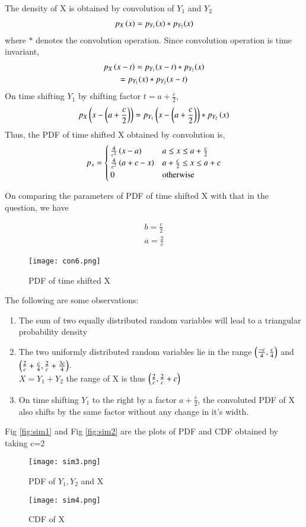 \documentclass[journal,12pt,twocolumn]{IEEEtran}
\begin{document}
The density of X is obtained by convolution of $Y_1$ and $Y_2$
\begin{align}
p_X\left(x\right) = p_{Y_1}(x)*p_{Y_2}(x)
\end{align}
where $*$ denotes the convolution operation. Since convolution operation is time invariant, 
\begin{multline}
    p_X\left(x-t\right) = p_{Y_1}(x-t)*p_{Y_2}(x) \\ = p_{Y_1}(x)*p_{Y_2}(x-t)
\end{multline}
On time shifting $Y_1$ by shifting factor $t=a+\frac{c}{2}$, 
\begin{align}
    p_X\left(x-\left(a+\frac{c}{2}\right)\right) =  p_{Y_1}\left(x-\left(a+\frac{c}{2}\right)\right)*p_{Y_2}\left(x\right)
\end{align}
Thus, the PDF of time shifted X obtained by convolution is,
\begin{align}
p_x = 
\begin{cases}
\frac{4}{c^2}\left(x-a\right) & a \le x \le a+\frac{c}{2}\\
\frac{4}{c^2}\left(a+c-x\right) & a+\frac{c}{2} \le x \le a+c \\
0 & \text{otherwise}
\end{cases}
\end{align}

On comparing the parameters of PDF of time shifted X with that in the question, we have

\begin{align}
    b=\frac{c}{2}\\
    a=\frac{2}{c}
\end{align}


\begin{figure}[H]
\centering
\texttt{[image: con6.png]}
\caption{PDF of time shifted X}
\label{fig:convolution}
\end{figure}
The following are some observations: 
\begin{enumerate}
    \item The sum of two equally distributed random variables will lead to a triangular probability density
    \item The two uniformly distributed random variables lie in the range $\left(\frac{-c}{4},\frac{c}{4}\right)$ and $\left(\frac{2}{c}+\frac{c}{4} , \frac{2}{c}+\frac{3c}{4}\right)$. \\
    \because $X = Y_1 + Y_2$ the range of X is thus $\left(\frac{2}{c},\frac{2}{c}+c\right)$
    \item On time shifting $Y_1$ to the right by a factor $a+\frac{c}{2}$, the convoluted PDF of X also shifts by the same factor without any change in it's width.
\end{enumerate}

Fig \ref{fig:sim1} and Fig \ref{fig:sim2} are the plots of PDF and CDF obtained by taking c=2
\begin{figure}[h!]
\centering
\texttt{[image: sim3.png]}
\caption{PDF of $Y_1, Y_2$ and X}
\label{fig:sim3}
\end{figure}
\begin{figure}[H]
\centering
\texttt{[image: sim4.png]}
\caption{CDF of X}
\label{fig:sim4}
\end{figure}
\end{document}
